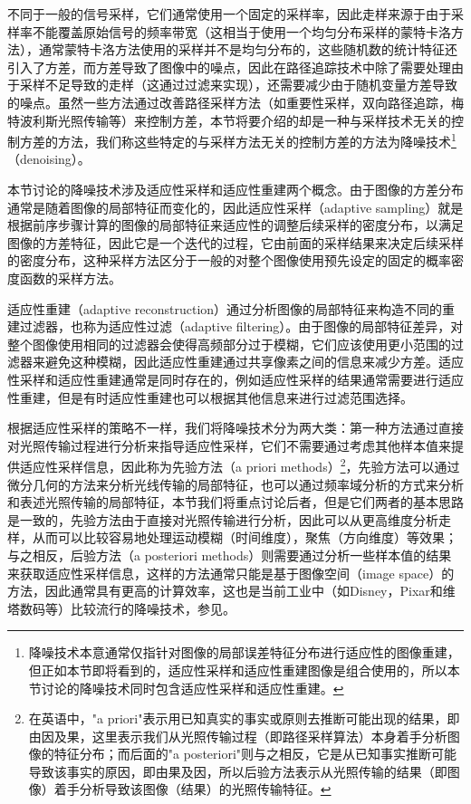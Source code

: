 不同于一般的信号采样，它们通常使用一个固定的采样率，因此走样来源于由于采样率不能覆盖原始信号的频率带宽（这相当于使用一个均匀分布采样的蒙特卡洛方法），通常蒙特卡洛方法使用的采样并不是均匀分布的，这些随机数的统计特征还引入了方差，而方差导致了图像中的噪点，因此在路径追踪技术中除了需要处理由于采样不足导致的走样（这通过过滤来实现），还需要减少由于随机变量方差导致的噪点。虽然一些方法通过改善路径采样方法（如重要性采样，双向路径追踪，梅特波利斯光照传输等）来控制方差，本节将要介绍的却是一种与采样技术无关的控制方差的方法，我们称这些特定的与采样方法无关的控制方差的方法为降噪技术\footnote{降噪技术本意通常仅指针对图像的局部误差特征分布进行适应性的图像重建，但正如本节即将看到的，适应性采样和适应性重建图像是组合使用的，所以本节讨论的降噪技术同时包含适应性采样和适应性重建。}（denoising）。

本节讨论的降噪技术涉及适应性采样和适应性重建两个概念。由于图像的方差分布通常是随着图像的局部特征而变化的，因此适应性采样（adaptive sampling）就是根据前序步骤计算的图像的局部特征来适应性的调整后续采样的密度分布，以满足图像的方差特征，因此它是一个迭代的过程，它由前面的采样结果来决定后续采样的密度分布，这种采样方法区分于一般的对整个图像使用预先设定的固定的概率密度函数的采样方法。

适应性重建（adaptive reconstruction）通过分析图像的局部特征来构造不同的重建过滤器，也称为适应性过滤（adaptive filtering）。由于图像的局部特征差异，对整个图像使用相同的过滤器会使得高频部分过于模糊，它们应该使用更小范围的过滤器来避免这种模糊，因此适应性重建通过共享像素之间的信息来减少方差。适应性采样和适应性重建通常是同时存在的，例如适应性采样的结果通常需要进行适应性重建，但是有时适应性重建也可以根据其他信息来进行过滤范围选择。

根据适应性采样的策略不一样，我们将降噪技术分为两大类：第一种方法通过直接对光照传输过程进行分析来指导适应性采样，它们不需要通过考虑其他样本值来提供适应性采样信息，因此称为先验方法（a priori methods）\footnote{在英语中，"a priori"表示用已知真实的事实或原则去推断可能出现的结果，即由因及果，这里表示我们从光照传输过程（即路径采样算法）本身着手分析图像的特征分布；而后面的"a posteriori"则与之相反，它是从已知事实推断可能导致该事实的原因，即由果及因，所以后验方法表示从光照传输的结果（即图像）着手分析导致该图像（结果）的光照传输特征。}，先验方法可以通过微分几何的方法来分析光线传输的局部特征，也可以通过频率域分析的方式来分析和表述光照传输的局部特征，本节我们将重点讨论后者，但是它们两者的基本思路是一致的，先验方法由于直接对光照传输进行分析，因此可以从更高维度分析走样，从而可以比较容易地处理运动模糊（时间维度），聚焦（方向维度）等效果；与之相反，后验方法（a posteriori methods）则需要通过分析一些样本值的结果来获取适应性采样信息，这样的方法通常只能是基于图像空间（image space）的方法，因此通常具有更高的计算效率，这也是当前工业中（如Disney，Pixar和维塔数码等）比较流行的降噪技术，参见\cite{a:RecentAdvancesinAdaptiveSamplingandReconstructionforMonteCarloRendering}。








